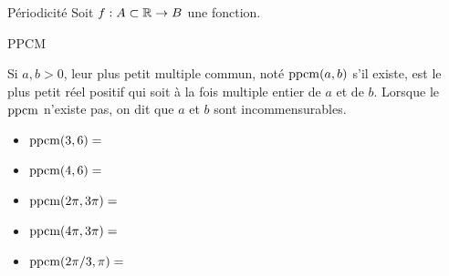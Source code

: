 \documentclass[french,t,handout,xcolor=svgnames]{beamer}
\begin{document}
\begin{frame}{Périodicité}
  Soit $f : A \subset \mathbb{R} \to B$ une fonction.%


\end{frame}
\begin{frame}{PPCM}
    \begin{definition}
      Si \(a, b > 0\), leur \og plus petit multiple commun\fg{}, noté \(\operatorname{ppcm}(a,b)\) s'il existe, est le plus petit réel positif qui soit à la fois multiple entier de \(a\) et de \(b\).{} Lorsque le \(\operatorname{ppcm}\) n'existe pas, on dit que \(a\) et \(b\) sont incommensurables.
  \end{definition}
  \begin{example}
    \begin{itemize}
    \item \(\operatorname{ppcm}(3,6) = \)
    \item \(\operatorname{ppcm}(4,6) = \)
    \item \(\operatorname{ppcm}(2\pi,3\pi) = \)
    \item \(\operatorname{ppcm}(4\pi,3\pi) = \)
    \item \(\operatorname{ppcm}(2\pi/3,\pi) = \)
  \end{itemize}
  \end{example}
\end{frame}
\end{document}
